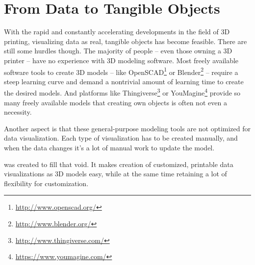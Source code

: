 
\section{From Data to Tangible Objects}

With the rapid and constantly accelerating developments in the field of 3D
printing, visualizing data as real, tangible objects has become feasible. There
are still some hurdles though.  The majority of people -- even those owning a 3D
printer -- have no experience with 3D modeling software. Most freely available
software tools to create 3D models -- like
OpenSCAD\footnote{\url{http://www.openscad.org/}} or
Blender\footnote{\url{http://www.blender.org/}} -- require a steep learning
curve and demand a nontrivial amount of learning time to create the desired
models. And platforms like
Thingiverse\footnote{\url{http://www.thingiverse.com/}} or
YouMagine\footnote{\url{https://www.youmagine.com/}} provide so many freely
available models that creating own objects is often not even a necessity.

Another aspect is that these general-purpose modeling tools are not optimized
for data visualization. Each type of visualization has to be created manually,
and when the data changes it's a lot of manual work to update the model.

\tangible{} was created to fill that void. It makes creation of customized,
printable data visualizations as 3D models easy, while at the same time
retaining a lot of flexibility for customization.

